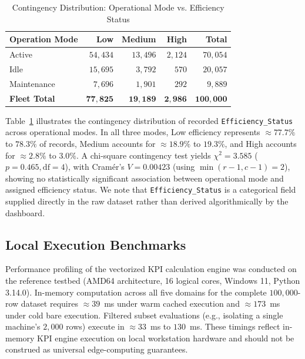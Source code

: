 \documentclass[journal]{IEEEtran}
\begin{document}
\begin{table}[h]
\centering
\caption{Contingency Distribution: Operational Mode vs. Efficiency Status}
\label{tab:efficiency_contingency}
\begin{tabular}{lrrrr}
\toprule
\textbf{Operation Mode} & \textbf{Low} & \textbf{Medium} & \textbf{High} & \textbf{Total} \\
\midrule
Active & $54{,}434$ & $13{,}496$ & $2{,}124$ & $70{,}054$ \\
Idle & $15{,}695$ & $3{,}792$ & $570$ & $20{,}057$ \\
Maintenance & $7{,}696$ & $1{,}901$ & $292$ & $9{,}889$ \\
\midrule
\textbf{Fleet Total} & $\mathbf{77{,}825}$ & $\mathbf{19{,}189}$ & $\mathbf{2{,}986}$ & $\mathbf{100{,}000}$ \\
\bottomrule
\end{tabular}
\end{table}

Table~\ref{tab:efficiency_contingency} illustrates the contingency distribution of recorded \texttt{Efficiency\_Status} across operational modes. In all three modes, Low efficiency represents $\approx 77.7\%$ to $78.3\%$ of records, Medium accounts for $\approx 18.9\%$ to $19.3\%$, and High accounts for $\approx 2.8\%$ to $3.0\%$. A chi-square contingency test yields $\chi^2 = 3.585$ ($p = 0.465, \text{df} = 4$), with Cramér's $V = 0.00423$ (using $\min(r-1, c-1) = 2$), showing no statistically significant association between operational mode and assigned efficiency status. We note that \texttt{Efficiency\_Status} is a categorical field supplied directly in the raw dataset rather than derived algorithmically by the dashboard.

\subsection{Local Execution Benchmarks}
Performance profiling of the vectorized KPI calculation engine was conducted on the reference testbed (AMD64 architecture, 16 logical cores, Windows 11, Python 3.14.0). In-memory computation across all five domains for the complete $100{,}000$-row dataset requires $\approx 39$~ms under warm cached execution and $\approx 173$~ms under cold bare execution. Filtered subset evaluations (e.g., isolating a single machine's $2{,}000$ rows) execute in $\approx 33$~ms to $130$~ms. These timings reflect in-memory KPI engine execution on local workstation hardware and should not be construed as universal edge-computing guarantees.
\end{document}
